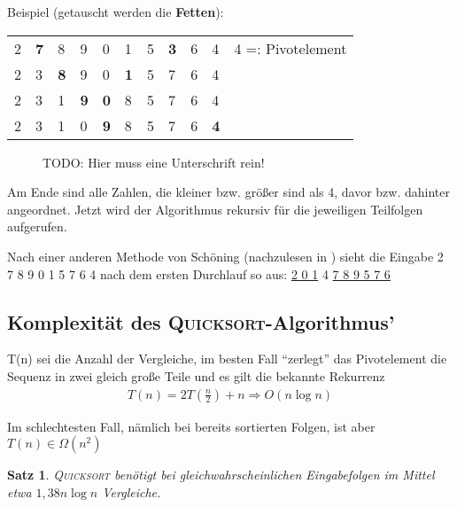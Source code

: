 \documentclass[ngerman,draft,parskip=half*,twoside]{scrreprt}
\theoremstyle{break}
\newtheorem{satz}{Satz}
\begin{document}
Beispiel (getauscht werden die \textbf{Fetten}):

\begin{tabular}{lllllllllll}
2 & \textbf{7} & 8 & 9 & 0 & 1 & 5 & \textbf{3} & 6 & 4 & \hspace{15pt} 4 =: Pivotelement\\
2 & 3 & \textbf{8} & 9 & 0 & \textbf{1} & 5 & 7 & 6 & 4 &\\ 
2 & 3 & 1 & \textbf{9} & \textbf{0} & 8 & 5 & 7 & 6 & 4 &\\
2 & 3 & 1 & 0 & \textbf{9} & 8 & 5 & 7 & 6 & \textbf{4} &\\
\end{tabular}

%
\begin{figure}[H]
  \centering
  
\caption{TODO: Hier muss eine Unterschrift rein!}
  \label{031103a}
\end{figure}

Am Ende sind alle Zahlen, die kleiner bzw. größer sind als 4, davor bzw. dahinter angeordnet. 
Jetzt wird der Algorithmus rekursiv für die jeweiligen Teilfolgen aufgerufen.

Nach einer anderen Methode von Schöning (nachzulesen in \cite{sedgewick}) sieht die Eingabe 2 7 8 9 0 1 5 7 6 4 nach dem ersten Durchlauf so aus: 
\underline{2 0 1} 4 \underline{7 8 9 5 7 6}

\subsection{Komplexität des \textsc{Quicksort}-Algorithmus'}

T(n) sei die Anzahl der Vergleiche, im besten Fall "`zerlegt"' das Pivotelement die Sequenz in zwei gleich große Teile und es gilt die
bekannte Rekurrenz
\begin{gather*}
T(n)=2T\left(\frac{n}{2}\right)+n \Rightarrow O(n \log n)
\end{gather*}

Im schlechtesten Fall, nämlich bei bereits sortierten Folgen, ist aber \(T(n) \in \Omega(n^2)\) 

\begin{satz}
\textsc{Quicksort} benötigt bei gleichwahrscheinlichen Eingabefolgen im Mittel etwa $1,38 n \log n$ Vergleiche.
\end{satz}
\end{document}
